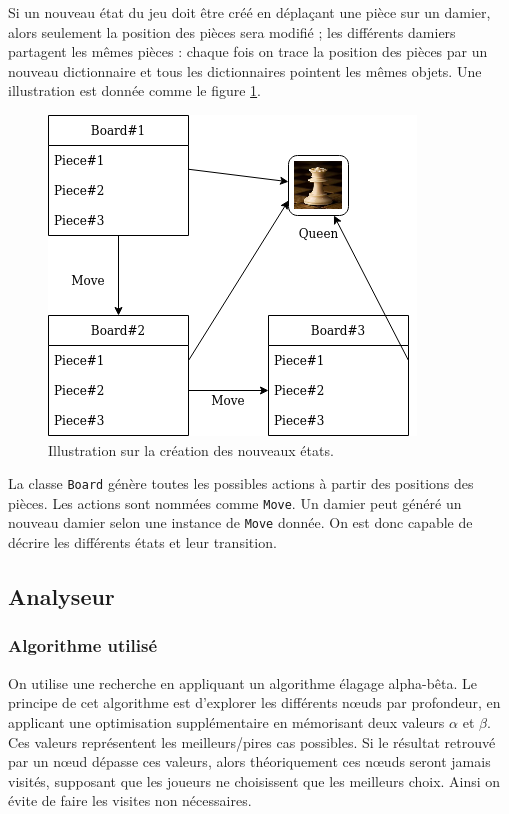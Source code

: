 \documentclass{article}
\begin{document}
\par Si un nouveau état du jeu doit être créé en déplaçant une pièce sur un damier, alors seulement la position des pièces sera modifié ; les différents damiers partagent les mêmes pièces : chaque fois on trace la position des pièces par un nouveau dictionnaire et tous les dictionnaires pointent les mêmes objets. Une illustration est donnée comme le figure \ref{fig:copies}.

\begin{figure}[htb]
    \centering
    \includegraphics[width = 0.7\linewidth]{illustation.png}
    \caption{Illustration sur la création des nouveaux états.}
    \label{fig:copies}
\end{figure}

\par La classe \texttt{Board} génère toutes les possibles actions à partir des positions des pièces. Les actions sont nommées comme \texttt{Move}. Un damier peut généré un nouveau damier selon une instance de \texttt{Move} donnée. On est donc capable de décrire les différents états et leur transition.

\subsection{Analyseur}
\subsubsection{Algorithme utilisé}
\par On utilise une recherche en appliquant un algorithme élagage alpha-bêta\cite{enwiki:Alphabeta}. Le principe de cet algorithme est d'explorer les différents nœuds par profondeur, en applicant une optimisation supplémentaire en mémorisant deux valeurs $\alpha$ et $\beta$. Ces valeurs représentent les meilleurs/pires cas possibles. Si le résultat retrouvé par un nœud dépasse ces valeurs, alors théoriquement ces nœuds seront jamais visités, supposant que les joueurs ne choisissent que les meilleurs choix. Ainsi on évite de faire les visites non nécessaires.
\end{document}
